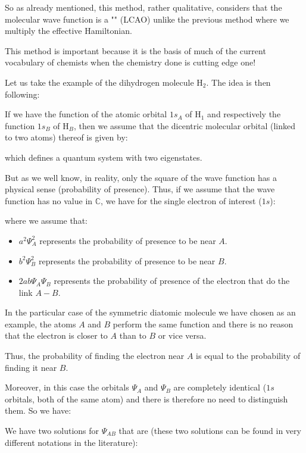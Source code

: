 	So as already mentioned, this method, rather qualitative, considers that the molecular wave function is a "" (LCAO) unlike the previous method where we multiply the effective Hamiltonian.
	
	This method is important because it is the basis of much of the current vocabulary of chemists when the chemistry done is cutting edge one!
	
	Let us take the example of the dihydrogen molecule $\mathrm{H}_2$. The idea is then following:
	
	If we have the function of the atomic orbital $1s_A$ of $\mathrm{H}_1$ and respectively the function $1s_B$ of $\mathrm{H}_B$, then we assume that the dicentric molecular orbital (linked to two atoms) thereof is given by:
	
	which defines a quantum system with two eigenstates.

	But as we well know, in reality, only the square of the wave function has a physical sense (probability of presence). Thus, if we assume that the wave function has no value in $\mathbb{C}$, we have for the single electron of interest ($1s$):
	
	where we assume that:
	\begin{itemize}
		\item $a^2\Psi_A^2$ represents the probability of presence to be near $A$.
		\item $b^2\Psi_B^2$ represents the probability of presence to be near $B$.
		\item $2ab\Psi_A\Psi_B$ represents the probability of presence of the electron that do the link $A-B$.
	\end{itemize}
	In the particular case of the symmetric diatomic molecule we have chosen as an example, the atoms $A$ and $B$ perform the same function and there is no reason that the electron is closer to $A$ than to $B$ or vice versa.

	Thus, the probability of finding the electron near $A$ is equal to the probability of finding it near $B$.
	
	Moreover, in this case the orbitals $\Psi_A$ and $\Psi_B$ are completely identical ($1s$ orbitals, both of the same atom) and there is therefore no need to distinguish them. So we have:
	
	We have two solutions for $\Psi_{AB}$ that are (these two solutions can be found in very different notations in the literature):
	
